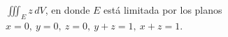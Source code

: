 \item $\iiint_E z \, dV$, en donde $E$ está limitada por los planos $x = 0, \ y = 0, \ z = 0, \ y + z = 1, \ x + z = 1$.
